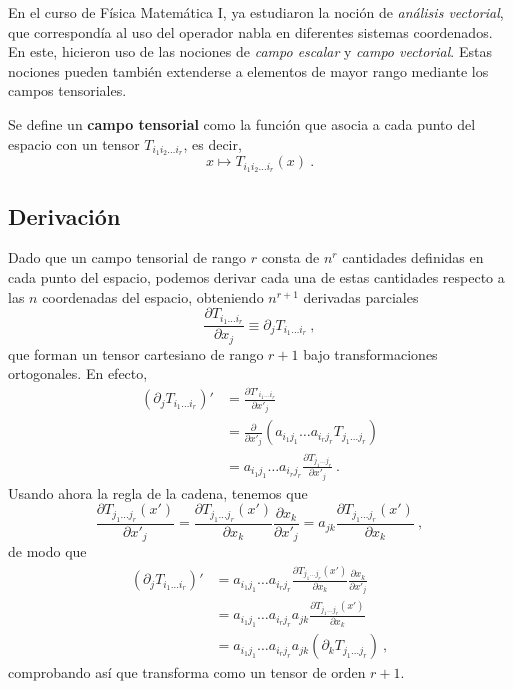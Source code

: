 En el curso de Física Matemática I, ya estudiaron la noción de \emph{análisis vectorial}, que correspondía al uso del operador nabla en diferentes sistemas coordenados. En este, hicieron uso de las nociones de \emph{campo escalar} y \emph{campo vectorial}. Estas nociones pueden también extenderse a elementos de mayor rango mediante los campos tensoriales.
\begin{defi} 
    Se define un \textbf{campo tensorial} como la función que asocia a cada punto del espacio con un tensor $T_{i_1 i_2 \dots i_r}$, es decir,
    \begin{equation}
        x \mapsto T_{i_1 i_2 \dots i_r}(x) \ .
    \end{equation}
\end{defi}

\subsection{Derivación}

Dado que un campo tensorial de rango $r$ consta de $n^r$ cantidades definidas en cada punto del espacio, podemos derivar cada una de estas cantidades respecto a las $n$ coordenadas del espacio, obteniendo $n^{r+1}$ derivadas parciales
\begin{equation}
    \frac{\partial T_{i_1 \dots i_r}}{\partial x_j} \equiv \partial_j T_{i_1 \dots i_r} \ ,
\end{equation}
que forman un tensor cartesiano de rango $r+1$ bajo transformaciones ortogonales. En efecto,
\begin{align}
    (\partial_j T_{i_1 \dots i_r})' & = \frac{\partial T'_{i_1 \dots i_r}}{\partial x'_j} \\
    & = \frac{\partial}{\partial x'_j}(a_{i_1 j_1} \dots a_{i_r j_r} T_{j_1 \dots j_r}) \\
    & = a_{i_1 j_1} \dots a_{i_r j_r} \frac{\partial T_{j_1 \dots j_r}}{\partial x'_j} \ .
\end{align}
Usando ahora la regla de la cadena, tenemos que
\begin{equation}
    \frac{\partial T_{j_1 \dots j_r}(x')}{\partial x'_j} = \frac{\partial T_{j_1 \dots j_r}(x')}{\partial x_k} \frac{\partial x_k}{\partial x'_j} = a_{jk} \frac{\partial T_{j_1 \dots j_r}(x')}{\partial x_k}\ ,
\end{equation}
de modo que
\begin{align}
    (\partial_j T_{i_1 \dots i_r})' & = a_{i_1 j_1} \dots a_{i_r j_r} \frac{\partial T_{j_1 \dots j_r}(x')}{\partial x_k} \frac{\partial x_k}{\partial x'_j} \\
    & = a_{i_1 j_1} \dots a_{i_r j_r}  a_{jk} \frac{\partial T_{j_1 \dots j_r}(x')}{\partial x_k} \\
    & = a_{i_1 j_1} \dots a_{i_r j_r}  a_{jk} (\partial_k T_{j_1 \dots j_r}) \ ,
\end{align}
comprobando así que transforma como un tensor de orden $r+1$.

